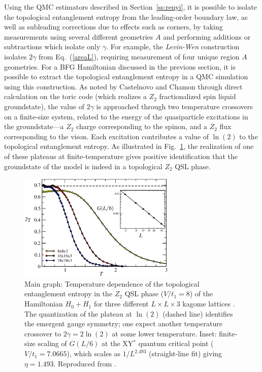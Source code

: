 \documentclass[10pt,pre,aps,twocolumn,showpacs,subscriptaddresses,floatfix]{revtex4}
\begin{document}
Using the QMC estimators described in Section~\ref{ss:renyi}, it is possible to isolate the topological entanglement entropy from the leading-order boundary law, as well as subleading corrections due to effects such as corners, by taking measurements using several different geometries $A$ and performing additions or subtractions which isolate only $\gamma$.  For example, the {\it Levin-Wen} \cite{LW} construction isolates $2\gamma$ from Eq.~(\ref{areaL}), requiring measurement of four unique region $A$ geometries.  For a BFG Hamiltonian discussed in the 
previous section, it is possible to extract the topological entanglement entropy in a QMC simulation using this construction.  As noted by Castelnovo and Chamon \cite{castelnovo} through direct calculation on the toric code (which realizes a $Z_2$ fractionalized spin liquid groundstate), the value of $2\gamma$ is approached through two temperature crossovers on a finite-size system, related to the energy of the quasiparticle excitations in the groundstate---a $Z_2$ charge corresponding to the spinon, and a $Z_2$ flux corresponding to the vison.  Each excitation contributes a value of $\ln(2)$ to the topological entanglement entropy.  As illustrated in Fig.~\ref{QSLfig}, the realization of one of these plateaus at finite-temperature gives positive identification that the groundstate of the model is indeed in a topological $Z_2$ QSL phase.

\begin{figure}
\includegraphics[width=7.5cm, clip]{fig10.eps}
\caption{Main graph: Temperature dependence of the topological entanglement entropy in the $Z_2$ QSL phase ($V/t_1 = 8$) of the Hamiltonian $H_0 + H_1$ 
for three different $L \times L \times 3$ kagome lattices \cite{TopoEE}.  The quantization of the plateau at $\ln(2)$ (dashed line) identifies the emergent 
gauge symmetry; one expect another temperature crossover to $2 \gamma = 2 \ln(2)$ at some lower temperature. Inset: finite-size scaling of $G(L/6)$ at the 
XY$^*$ quantum critical point ($V/t_1 = 7.0665$), which scales as  $1/L^{2.493}$ (straight-line fit) giving $\eta = 1.493$. Reproduced from \cite{XYstarQMC}.}
\label{QSLfig}
\end{figure}
\end{document}
